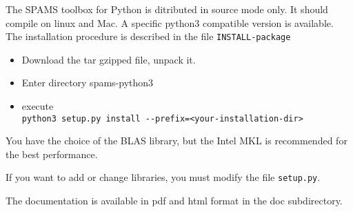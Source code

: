 The SPAMS toolbox for Python is ditributed in source mode only.
It should compile on linux and Mac. A specific python3 compatible version
is available.
The installation procedure is described in the file \verb=INSTALL-package=
\begin{itemize}
\item Download the tar gzipped file, unpack it.
\item Enter directory spams-python3
\item execute \\
  \verb;python3 setup.py install --prefix=<your-installation-dir>;
\end{itemize}

You have the choice of the BLAS library, but the Intel
MKL is recommended for the best performance.

If you want to add or change libraries, you must modify
the file \verb=setup.py=.

The documentation is available in pdf and html format in the doc subdirectory.
